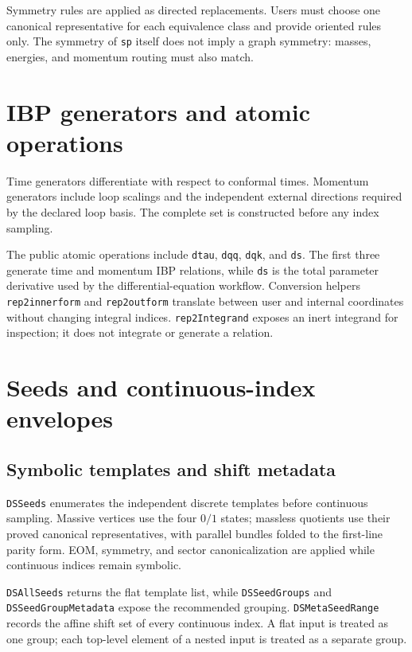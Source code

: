 ﻿\documentclass[a4paper,11pt]{article}
\begin{document}
Symmetry rules are applied as directed replacements. Users must choose one canonical
representative for each equivalence class and provide oriented rules only. The symmetry of
\texttt{sp} itself does not imply a graph symmetry: masses, energies, and momentum routing
must also match.

\section{IBP generators and atomic operations}

Time generators differentiate with respect to conformal times. Momentum generators include
loop scalings and the independent external directions required by the declared loop basis.
The complete set is constructed before any index sampling.

The public atomic operations include \texttt{dtau}, \texttt{dqq}, \texttt{dqk}, and
\texttt{ds}. The first three generate time and momentum IBP relations, while \texttt{ds}
is the total parameter derivative used by the differential-equation workflow. Conversion
helpers \texttt{rep2innerform} and \texttt{rep2outform} translate between user and internal
coordinates without changing integral indices. \texttt{rep2Integrand} exposes an inert
integrand for inspection; it does not integrate or generate a relation.

\section{Seeds and continuous-index envelopes}

\subsection{Symbolic templates and shift metadata}

\texttt{DSSeeds} enumerates the independent discrete templates before continuous sampling.
Massive vertices use the four $0/1$ states; massless quotients use their proved canonical
representatives, with parallel bundles folded to the first-line parity form. EOM, symmetry,
and sector canonicalization are applied while continuous
indices remain symbolic.

\texttt{DSAllSeeds} returns the flat template list, while \texttt{DSSeedGroups} and
\texttt{DSSeedGroupMetadata} expose the recommended grouping. \texttt{DSMetaSeedRange}
records the affine shift set of every continuous index. A flat input is treated as one
group; each top-level element of a nested input is treated as a separate group.
\end{document}

